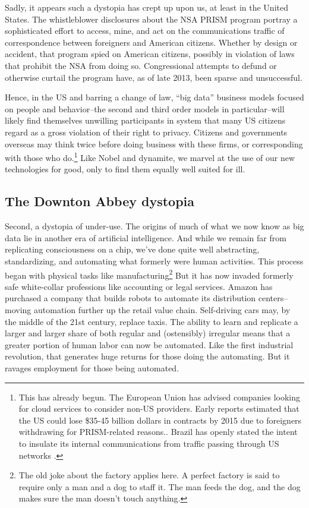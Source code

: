 \documentclass[12pt]{article}
\begin{document}
Sadly, it appears such a dystopia has crept up upon us, at least in
the United States. The whistleblower disclosures about the NSA PRISM
program portray a sophisticated effort to access, mine, and act on the
communications traffic of correspondence between foreigners and
American citizens. Whether by design or accident, that program spied
on American citizens, possibly in violation of laws that prohibit the
NSA from doing so. Congressional attempts to defund or otherwise
curtail the program have, as of late 2013, been sparse and
unsuccessful.

Hence, in the US and barring a change of law, ``big data'' business
models focused on people and behavior--the second and third order
models in particular--will likely find themselves unwilling
participants in system that many US citizens regard as a gross
violation of their right to privacy. Citizens and governments overseas may think
twice before doing business with these firms, or corresponding with
those who do.\footnote{This has already begun. The European Union has
  advised companies looking for cloud services to consider non-US
  providers. Early reports estimated that the US could lose \$35-45
  billion dollars in contracts by 2015 due to foreigners withdrawing
  for PRISM-related reasons.\citep{babcock2013}. Brazil has openly
  stated the intent to insulate its internal communications from
  traffic passing through US networks \citep{bbc2013brazil}.} Like
Nobel and dynamite, we marvel at the use of our new technologies for good, only to
find them equally well suited for ill.

\subsection{The Downton Abbey dystopia}
\label{sec:downt-abbey-dyst}

Second, a dystopia of under-use. The origins of much of what we now
know as big data lie in another era of artificial intelligence. And
while we remain far from replicating consciousness on a chip, we've
done quite well abstracting, standardizing, and automating what
formerly were human activities. This process began with physical tasks
like manufacturing\footnote{The old joke about the factory applies
  here. A perfect factory is said to require only a man and a dog to
  staff it. The man feeds the dog, and the dog makes sure the man
  doesn't touch anything.} But it has now invaded formerly safe
white-collar professions like accounting or legal services. Amazon has
purchased a company that builds robots to automate its distribution
centers--moving automation further up the retail value
chain. Self-driving cars may, by the middle of the 21st century,
replace taxis. The ability to learn and replicate a larger
and larger share of both regular and (ostensibly) irregular means that
a greater portion of human labor can now be automated. Like the first
industrial revolution, that generates huge returns for those doing the
automating. But it ravages employment for those being automated. 
\end{document}
